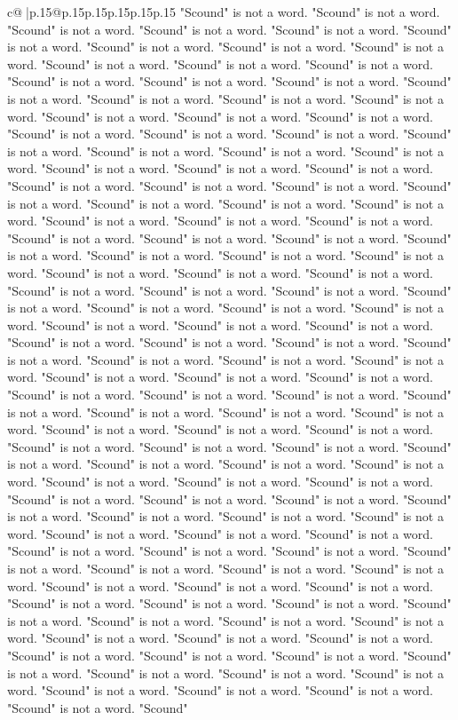 \documentclass{article}
\begin{document}
{\begin{supertabular}{c@{$\;$}|p{.15\linewidth}@{}p{.15\linewidth}p{.15\linewidth}p{.15\linewidth}p{.15\linewidth}p{.15\linewidth}}
{{{"Scound" is not a word. "Scound" is not a word. "Scound" is not a word. "Scound" is not a word. "Scound" is not a word. "Scound" is not a word. "Scound" is not a word. "Scound" is not a word. "Scound" is not a word. "Scound" is not a word. "Scound" is not a word. "Scound" is not a word. "Scound" is not a word. "Scound" is not a word. "Scound" is not a word. "Scound" is not a word. "Scound" is not a word. "Scound" is not a word. "Scound" is not a word. "Scound" is not a word. "Scound" is not a word. "Scound" is not a word. "Scound" is not a word. "Scound" is not a word. "Scound" is not a word. "Scound" is not a word. "Scound" is not a word. "Scound" is not a word. "Scound" is not a word. "Scound" is not a word. "Scound" is not a word. "Scound" is not a word. "Scound" is not a word. "Scound" is not a word. "Scound" is not a word. "Scound" is not a word. "Scound" is not a word. "Scound" is not a word. "Scound" is not a word. "Scound" is not a word. "Scound" is not a word. "Scound" is not a word. "Scound" is not a word. "Scound" is not a word. "Scound" is not a word. "Scound" is not a word. "Scound" is not a word. "Scound" is not a word. "Scound" is not a word. "Scound" is not a word. "Scound" is not a word. "Scound" is not a word. "Scound" is not a word. "Scound" is not a word. "Scound" is not a word. "Scound" is not a word. "Scound" is not a word. "Scound" is not a word. "Scound" is not a word. "Scound" is not a word. "Scound" is not a word. "Scound" is not a word. "Scound" is not a word. "Scound" is not a word. "Scound" is not a word. "Scound" is not a word. "Scound" is not a word. "Scound" is not a word. "Scound" is not a word. "Scound" is not a word. "Scound" is not a word. "Scound" is not a word. "Scound" is not a word. "Scound" is not a word. "Scound" is not a word. "Scound" is not a word. "Scound" is not a word. "Scound" is not a word. "Scound" is not a word. "Scound" is not a word. "Scound" is not a word. "Scound" is not a word. "Scound" is not a word. "Scound" is not a word. "Scound" is not a word. "Scound" is not a word. "Scound" is not a word. "Scound" is not a word. "Scound" is not a word. "Scound" is not a word. "Scound" is not a word. "Scound" is not a word. "Scound" is not a word. "Scound" is not a word. "Scound" is not a word. "Scound" is not a word. "Scound" is not a word. "Scound" is not a word. "Scound" is not a word. "Scound" is not a word. "Scound" is not a word. "Scound" is not a word. "Scound" is not a word. "Scound" is not a word. "Scound" is not a word. "Scound" is not a word. "Scound" is not a word. "Scound" is not a word. "Scound" is not a word. "Scound" is not a word. "Scound" is not a word. "Scound" is not a word. "Scound" is not a word. "Scound" is not a word. "Scound" is not a word. "Scound" is not a word. "Scound" is not a word. "Scound" is not a word. "Scound" is not a word. "Scound" is not a word. "Scound" is not a word. "Scound" is not a word. "Scound" is not a word. "Scound" is not a word. "Scound" is not a word. "Scound" is not a word. "Scound" is not a word. "Scound" is not a word. "Scound" is not a word. "Scound" is not a word. "Scound" is not a word. "Scound" is not a word. "Scound" is not a word. "Scound" }}}
\end{supertabular}}
\end{document}
